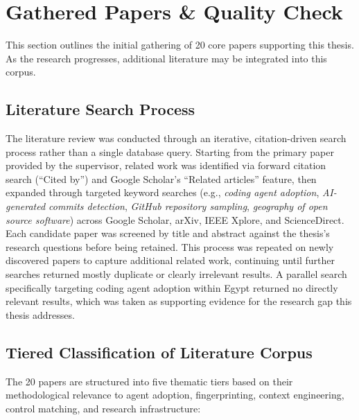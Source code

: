 \documentclass[11pt,a4paper]{article}
\begin{document}
\section{Gathered Papers \& Quality Check}
This section outlines the initial gathering of 20 core papers supporting this thesis. As the research progresses, additional literature may be integrated into this corpus.

\subsection{Literature Search Process}

The literature review was conducted through an iterative, citation-driven search process rather than a single database query. Starting from the primary paper provided by the supervisor, related work was identified via forward citation search (``Cited by'') and Google Scholar's ``Related articles'' feature, then expanded through targeted keyword searches (e.g., \textit{coding agent adoption}, \textit{AI-generated commits detection}, \textit{GitHub repository sampling}, \textit{geography of open source software}) across Google Scholar, arXiv, IEEE Xplore, and ScienceDirect. Each candidate paper was screened by title and abstract against the thesis's research questions before being retained. This process was repeated on newly discovered papers to capture additional related work, continuing until further searches returned mostly duplicate or clearly irrelevant results. A parallel search specifically targeting coding agent adoption within Egypt returned no directly relevant results, which was taken as supporting evidence for the research gap this thesis addresses.

\subsection{Tiered Classification of Literature Corpus}
The 20 papers are structured into five thematic tiers based on their methodological relevance to agent adoption, fingerprinting, context engineering, control matching, and research infrastructure:
\end{document}
